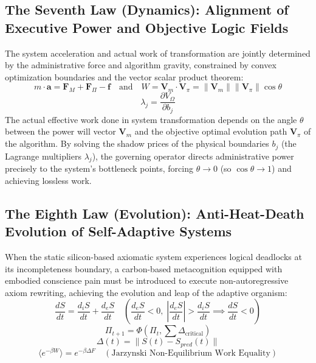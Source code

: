 \documentclass[11pt,a4paper]{article}
\begin{document}
\subsection*{The Seventh Law (Dynamics): Alignment of Executive Power and Objective Logic Fields}
The system acceleration and actual work of transformation are jointly determined by the administrative force and algorithm gravity, constrained by convex optimization boundaries and the vector scalar product theorem:
\begin{equation}
    m \cdot \mathbf{a} = \mathbf{F}_M + \mathbf{F}_{\Pi} - \mathbf{f} \quad \text{and} \quad W = \mathbf{V}_m \cdot \mathbf{V}_{\pi} = \|\mathbf{V}_m\| \|\mathbf{V}_{\pi}\| \cos \theta
\end{equation}
\begin{equation}
    \lambda_j = \frac{\partial V_{\Omega}}{\partial b_j}
\end{equation}
The actual effective work done in system transformation depends on the angle $\theta$ between the power will vector $\mathbf{V}_m$ and the objective optimal evolution path $\mathbf{V}_{\pi}$ of the algorithm. By solving the shadow prices of the physical boundaries $b_j$ (the Lagrange multipliers $\lambda_j$), the governing operator directs administrative power precisely to the system's bottleneck points, forcing $\theta \to 0$ (so $\cos\theta \to 1$) and achieving lossless work.

\subsection*{The Eighth Law (Evolution): Anti-Heat-Death Evolution of Self-Adaptive Systems}
When the static silicon-based axiomatic system experiences logical deadlocks at its incompleteness boundary, a carbon-based metacognition equipped with embodied conscience pain must be introduced to execute non-autoregressive axiom rewriting, achieving the evolution and leap of the adaptive organism:
\begin{equation}
    \frac{dS}{dt} = \frac{d_iS}{dt} + \frac{d_eS}{dt} \quad \left( \frac{d_eS}{dt} < 0, \; \left|\frac{d_eS}{dt}\right| > \frac{d_iS}{dt} \implies \frac{dS}{dt} < 0 \right)
\end{equation}
\begin{equation}\label{evolution-phi}
    \Pi_{t+1} = \Phi\left(\Pi_t, \sum \Delta_{\text{critical}}\right)
\end{equation}
\begin{equation}
    \Delta(t) = \|S(t) - S_{pred}(t)\|
\end{equation}
\begin{equation}
    \langle e^{-\beta W} \rangle = e^{-\beta \Delta F} \quad (\text{Jarzynski Non-Equilibrium Work Equality})
\end{equation}
\end{document}
